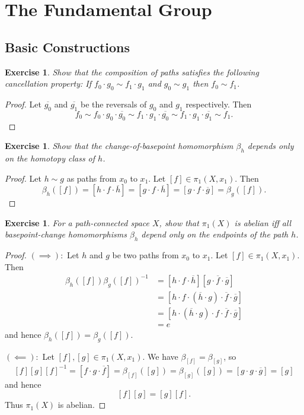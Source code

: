 \documentclass{article}
\newtheorem{exercise}[theorem]{Exercise}
\begin{document}
\section{The Fundamental Group}
\subsection{Basic Constructions}
\begin{exercise}
Show that the composition of paths satisfies the following cancellation property: If $f_0\cdot g_0\sim f_1\cdot g_1$ and $g_0\sim g_1$ then $f_0\sim f_1$.
\end{exercise}
\begin{proof}
Let $\overline{g_0}$ and $\overline{g_1}$ be the reversals of $g_0$ and $g_1$ respectively. Then\[f_0\sim f_0\cdot g_0\cdot\overline{g_0}\sim f_1\cdot g_1\cdot \overline{g_0}\sim f_1\cdot g_1\cdot \overline{g_1}\sim f_1.\]
\end{proof}

\begin{exercise}
Show that the change-of-basepoint homomorphism $\beta_h$ depends only on the homotopy class of $h$.
\end{exercise}
\begin{proof}
Let $h\sim g$ as paths from $x_0$ to $x_1$. Let $[f]\in\pi_1(X,x_1)$. Then \[\beta_h([f])=[h\cdot f\cdot\overline{h}]=[g\cdot f\cdot\overline{h}]=[g\cdot f\cdot\overline{g}]=\beta_g([f]).\]
\end{proof}

\begin{exercise}
For a path-connected space $X$, show that $\pi_1(X)$ is abelian iff all basepoint-change homomorphisms $\beta_h$ depend only on the endpoints of the path $h$.
\end{exercise}
\begin{proof}
$(\implies):$ Let $h$ and $g$ be two paths from $x_0$ to $x_1$. Let $[f]\in\pi_1(X,x_1)$. Then\begin{align*}\beta_h([f])\beta_g([f])^{-1}&=[h\cdot f\cdot\overline{h}][g\cdot\overline{f}\cdot \overline{g}]\\&=[h\cdot f\cdot(\overline{h}\cdot g)\cdot\overline{f}\cdot \overline{g}]\\&=[h\cdot(\overline h\cdot g)\cdot f\cdot \overline{f}\cdot \overline{g}]\\&=e\end{align*}and hence $\beta_h([f])=\beta_g([f])$.

$(\impliedby):$ Let $[f],[g]\in\pi_1(X,x_1)$. We have $\beta_{[f]}=\beta_{[g]}$, so\[[f][g][f]^{-1}=[f\cdot g\cdot \overline{f}]=\beta_{[f]}([g])=\beta_{[g]}([g])=[g\cdot g\cdot \overline{g}]=[g]\] and hence\[[f][g]=[g][f].\] Thus $\pi_1(X)$ is abelian.
\end{proof}
\end{document}
